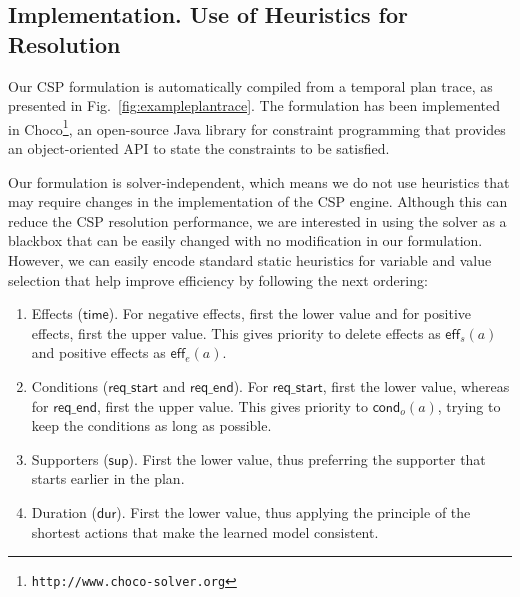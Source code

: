 \documentclass[runningheads]{llncs}
\newcommand{\eff}{\mathsf{eff}}    %
\newcommand{\cond}{\mathsf{cond}}  %
\newcommand{\dur}{\mathsf{dur}}    %
\newcommand{\supp}{\mathsf{sup}}   %
\newcommand{\tim}{\mathsf{time}}   %
\newcommand{\reqs}{\mathsf{req\_{start}}} %
\newcommand{\reqe}{\mathsf{req\_{end}}}   %
\begin{document}
\subsection{Implementation. Use of Heuristics for Resolution}
\label{sec:implementation}

Our CSP formulation is automatically compiled from a temporal plan trace, as presented in Fig.~\ref{fig:exampleplantrace}. The formulation has been implemented in \textsf{Choco}\footnote{\texttt{http://www.choco-solver.org}}, an open-source Java library for constraint programming that provides an object-oriented API to state the constraints to be satisfied.

Our formulation is solver-independent, which means we do not use heuristics that may require changes in the implementation of the CSP engine.
Although this can reduce the CSP resolution performance, we are interested in using the solver as a blackbox that can be easily changed with no modification in our formulation. However, we can easily encode standard static heuristics for variable and value selection that help improve efficiency by following the next ordering:



\begin{enumerate}
  \item Effects ($\tim$). For negative effects, first the lower value and for positive effects, first the upper value. This gives priority to delete effects as $\eff_s(a)$ and positive effects as $\eff_e(a)$.
  \item Conditions ($\reqs$ and $\reqe$). For $\reqs$, first the lower value, whereas for $\reqe$, first the upper value. This gives priority to $\cond_o(a)$, trying to keep the conditions as long as possible.
  \item Supporters ($\supp$). First the lower value, thus preferring the supporter that starts earlier in the plan.
  \item Duration ($\dur$). First the lower value, thus applying the principle of the shortest actions that make the learned model consistent.
\end{enumerate}
\end{document}
